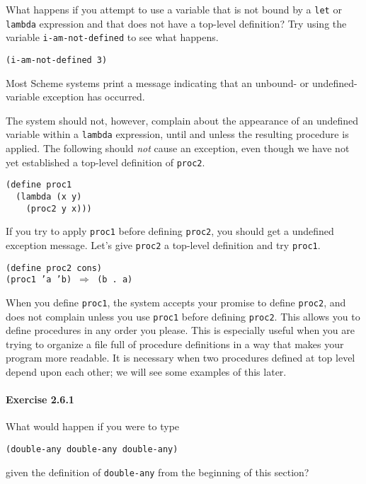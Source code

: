 What happens if you attempt to use a variable that is not bound by a
\texttt{let} or \texttt{lambda} expression and that does not have a top-level
definition?
Try using the variable \texttt{i-am-not-defined} to see what happens.


\texttt{(i-am-not-defined 3)}

Most Scheme systems print a message
indicating that an unbound- or undefined-variable exception
has occurred.


The system should not, however, complain
about the appearance of an undefined variable
within a \texttt{lambda} expression, until and unless the resulting procedure
is applied.
The following should \textit{not} cause an exception, even though we have not yet
established a top-level definition of \texttt{proc2}.


\begin{alltt}
(define proc1
  (lambda (x y)
    (proc2 y x)))
\end{alltt}


If you try to apply \texttt{proc1} before defining \texttt{proc2}, you should get
a undefined exception message.
Let's give \texttt{proc2} a top-level definition and try \texttt{proc1}.


\begin{alltt}
(define proc2 cons)
(proc1 'a 'b) \(\Rightarrow\) (b . a)
\end{alltt}


When you define \texttt{proc1}, the system accepts your promise to define
\texttt{proc2}, and does not complain unless you use \texttt{proc1} before
defining \texttt{proc2}.
This allows you to define procedures in any order you please.
This is especially useful when you are trying to organize a file full of
procedure definitions in a way that makes your program more readable.
It is necessary when two procedures defined at top level depend upon
each other; we will see some examples of this later.


\paragraph{Exercise \label{start_g26}2.6.1}


\label{start_s91}What would happen if you were to type


\texttt{(double-any double-any double-any)}

given the definition of \texttt{double-any} from the beginning of this
section?




